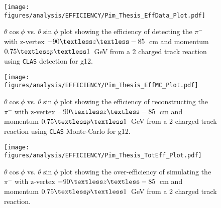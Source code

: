 \documentclass[11pt,a4paper]{article}
\newcommand{\abbr}[1]{\textsc{\texttt{#1}}}
\def\figures{/Users/michaelkunkel/WORK/GIT_HUB/THESIS/figures/print}
\newlength{\figwidth}
\newlength{\hfigheight}
\begin{document}
\begin{figure}[h!]\begin{center}
    \texttt{[image: \\figures/analysis/EFFICIENCY/Pim\_Thesis\_EffData\_Plot.pdf]}
    \caption[$\theta \cos\phi$ vs. $\theta \sin\phi$ plot showing the efficiency of detecting the $\pi^-$ with z-vertex $-90\textless z\textless-85$~cm and momentum $0.75\textless p \textless 1$~GeV from a 2 charged track reaction using \abbr{CLAS} detection for g12]{\label{fig:eff_pim_data} $\theta \cos\phi$ vs. $\theta \sin\phi$ plot showing the efficiency of detecting the $\pi^-$ with z-vertex $-90\textless z\textless-85$~cm and momentum $0.75\textless p \textless 1$~GeV from a 2 charged track reaction using \abbr{CLAS} detection for g12.}
  \end{center}\end{figure}
%
\begin{figure}[h!]\begin{center}
    \texttt{[image: \\figures/analysis/EFFICIENCY/Pim\_Thesis\_EffMC\_Plot.pdf]}
    \caption[$\theta \cos\phi$ vs. $\theta \sin\phi$ plot showing the efficiency of reconstructing the $\pi^-$ with z-vertex $-90\textless z\textless-85$~cm and momentum $0.75\textless p \textless 1$~GeV from a 2 charged track reaction using \abbr{CLAS} Monte-Carlo for g12]{\label{fig:eff_pim_MC} $\theta \cos\phi$ vs. $\theta \sin\phi$ plot showing the efficiency of reconstructing the $\pi^-$ with z-vertex $-90\textless z\textless-85$~cm and momentum $0.75\textless p \textless 1$~GeV from a 2 charged track reaction using \abbr{CLAS} Monte-Carlo for g12.}
  \end{center}\end{figure}
%
\begin{figure}[h!]\begin{center}
    \texttt{[image: \\figures/analysis/EFFICIENCY/Pim\_Thesis\_TotEff\_Plot.pdf]}
    \caption[$\theta \cos\phi$ vs. $\theta \sin\phi$ plot showing the over-efficiency of simulating the $\pi^-$ with z-vertex $-90\textless z\textless-85$~cm and momentum $0.75\textless p \textless 1$~GeV from a 2 charged track reaction]{\label{fig:toteff_pim} $\theta \cos\phi$ vs. $\theta \sin\phi$ plot showing the over-efficiency of simulating the $\pi^-$ with z-vertex $-90\textless z\textless-85$~cm and momentum $0.75\textless p \textless 1$~GeV from a 2 charged track reaction.}
  \end{center}\end{figure}
\FloatBarrier
%
\end{document}
